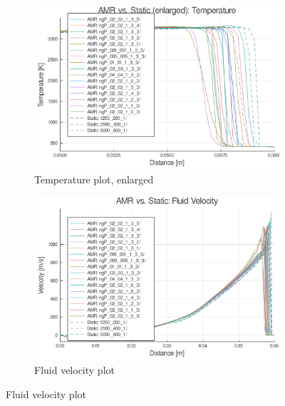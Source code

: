 \begin{figure} \ContinuedFloat


    \centering
    \begin{subfigure}[]{\textwidth}
        \centering
        \includegraphics[width=\textwidth]{./figs/amrfigs/amrcompare_all/te.png}
        \caption{Temperature plot, enlarged}
    \end{subfigure}

    
    \centering
    \begin{subfigure}[]{\textwidth}
        \centering
        \includegraphics[width=\textwidth]{./figs/amrfigs/amrcompare_all/u.png}
        \caption{Fluid velocity plot}
    \end{subfigure}

\end{figure}
